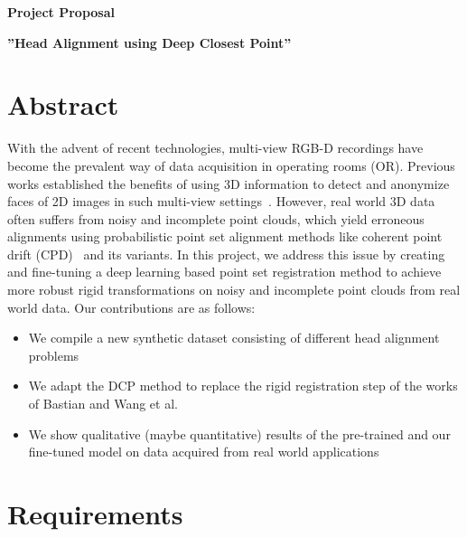 \documentclass[a4paper,pagesize 10pt]{scrartcl}
\begin{document}
\begin{center}{\Huge\textbf{Project Proposal}}\end{center}
\begin{center}{\Large\textbf{''Head Alignment using Deep Closest Point''}}\end{center}

\section{Abstract}


With the advent of recent technologies, multi-view RGB-D recordings have become the prevalent way of data acquisition in operating rooms (OR).
Previous works established the benefits of using 3D information to detect and anonymize faces of 2D images in such multi-view settings~\cite{disguisor}.
However, real world 3D data often suffers from noisy and incomplete point clouds, which yield erroneous alignments using probabilistic point set alignment methods like coherent point drift (CPD)~\cite{cpd} and its variants.
In this project, we address this issue by creating and fine-tuning a deep learning based point set registration method to achieve more robust rigid transformations on noisy and incomplete point clouds from real world data.
Our contributions are as follows:
 
\begin{itemize}
\itemsep0em
	\item We compile a new synthetic dataset consisting of different head alignment problems
	\item We adapt the DCP method to replace the rigid registration step of the works of Bastian and Wang et al.~\cite{disguisor}
	\item We show qualitative (maybe quantitative) results of the pre-trained and our fine-tuned model on data acquired from real world applications
\end{itemize}


\section{Requirements}
\end{document}
